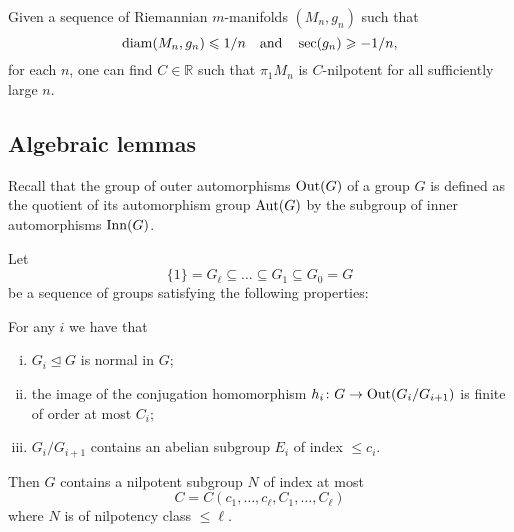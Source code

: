 \documentclass{amsart}
\begin{document}
Given a sequence of Riemannian $m$-manifolds $(M_n,g_n)$
such that
\[\operatorname{\rm diam}(M_n,g_n)\leqslant 1/n
 \quad\text{and}\quad
 \sec(g_n)\geqslant -1/n,
\]
for each $n$, one can find $C\in \mathbb{R}$  such that
$\pi_1M_{n}$ is $C$-nilpotent for all sufficiently large $n$.

\subsection{Algebraic lemmas}

Recall that
the group of outer automorphisms $\operatorname{\rm Out}(G)$ of a group $G$
is defined as the quotient of its automorphism group
$\operatorname{\rm Aut}(G)$ by the subgroup of inner automorphisms $\operatorname{\rm Inn}(G)$.


\begin{lem}\label{lem:cnilp}
Let
$$\{1\}=G_\ell\subseteq \ldots\subseteq G_1\subseteq G_0=G$$
  be a sequence of groups satisfying the following properties:

For any $i$ we have that
\begin{enumerate}[(i)]
\item $G_i \unlhd G$ is normal in $G$;
\item the image of the conjugation homomorphism
$h_i\colon  G\to \operatorname{\rm Out}(G_i/G_{i+1})$ is finite of order at most $C_i$;
\item $G_i/G_{i+1}$ contains an abelian subgroup $E_i$ of index  $\le c_i$.
\end{enumerate}
Then $G$ contains a nilpotent subgroup $N$ of index at most
$$C=C(c_1,\ldots, c_\ell, C_1,\ldots, C_\ell)$$
where $N$ is of nilpotency class $\le \ell$.
\end{lem}
\end{document}
